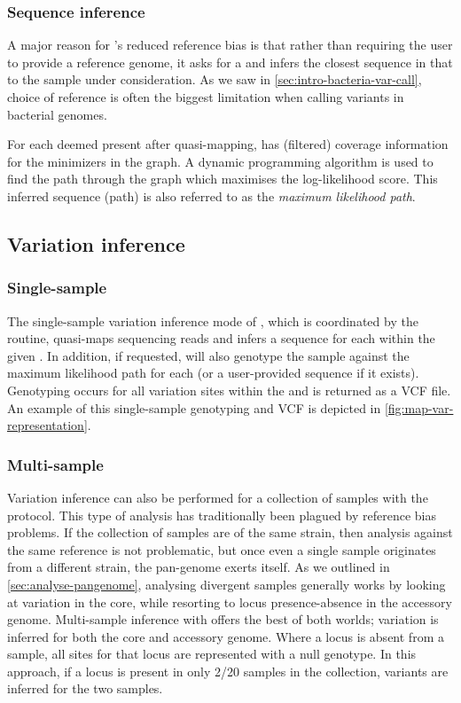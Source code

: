 \subsubsection{Sequence inference}
A major reason for \pandora{}'s reduced reference bias is that rather than requiring the user to provide a reference genome, it asks for a \panrg{} and infers the closest sequence in that \panrg{} to the sample under consideration. As we saw in \autoref{sec:intro-bacteria-var-call}, choice of reference is often the biggest limitation when calling variants in bacterial genomes.

For each \prg{} deemed present after quasi-mapping, \pandora{} has (filtered) coverage information for the minimizers in the \kmer{} graph. A dynamic programming algorithm is used to find the path through the \kmer{} graph which maximises the log-likelihood score. This inferred sequence (path) is also referred to as the \emph{maximum likelihood path}.

\subsection{Variation inference}

\subsubsection{Single-sample}
The single-sample variation inference mode of \pandora{}, which is coordinated by the \map{} routine, quasi-maps sequencing reads and infers a sequence for each \prg{} within the given \panrg{}. In addition, if requested, \map{} will also genotype the sample against the maximum likelihood path for each \prg{} (or a user-provided sequence if it exists). Genotyping occurs for all variation sites within the \prg{} and is returned as a VCF file. An example of this single-sample genotyping and VCF is depicted in \autoref{fig:map-var-representation}.

\subsubsection{Multi-sample}
\label{sec:pandora-compare}
Variation inference can also be performed for a collection of samples with the \compare{} protocol. This type of analysis has traditionally been plagued by reference bias problems. If the collection of samples are of the same strain, then analysis against the same reference is not problematic, but once even a single sample originates from a different strain, the pan-genome exerts itself. As we outlined in \autoref{sec:analyse-pangenome}, analysing divergent samples generally works by looking at variation in the core, while resorting to locus presence-absence in the accessory genome. Multi-sample inference with \compare{} offers the best of both worlds; variation is inferred for both the core and accessory genome. Where a locus is absent from a sample, all sites for that locus are represented with a null genotype. In this approach, if a locus is present in only 2/20 samples in the collection, variants are inferred for the two samples.

